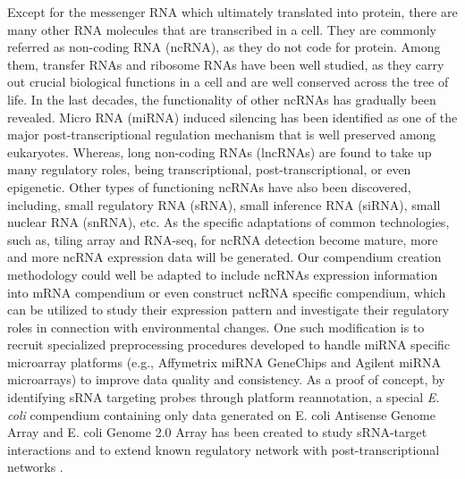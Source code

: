 Except for the messenger RNA which ultimately translated into protein, there are many other RNA molecules that are transcribed in a cell. They are commonly referred as non-coding RNA (ncRNA), as they do not code for protein. Among them, transfer RNAs and ribosome RNAs have been well studied, as they carry out crucial biological functions in a cell and are well conserved across the tree of life. In the last decades, the functionality of other ncRNAs has gradually been revealed. Micro RNA (miRNA) induced silencing has been identified as one of the major post-transcriptional regulation mechanism that is well preserved among eukaryotes\cite{Chen2007a}. Whereas, long non-coding RNAs (lncRNAs) are found to take up many regulatory roles, being transcriptional, post-transcriptional, or even epigenetic\cite{Baker2011}. Other types of functioning ncRNAs have also been discovered, including, small regulatory RNA (sRNA), small inference RNA (siRNA), small nuclear RNA (snRNA), etc. As the specific adaptations of common technologies, such as, tiling array and RNA-seq, for ncRNA detection become mature, more and more ncRNA expression data will be generated. Our compendium creation methodology could well be adapted to include ncRNAs expression information into mRNA compendium or even construct ncRNA specific compendium, which can be utilized to study their expression pattern and investigate their regulatory roles in connection with environmental changes. One such modification is to recruit specialized preprocessing procedures developed to handle miRNA specific microarray platforms (e.g., Affymetrix miRNA GeneChips and Agilent miRNA microarrays) to improve data quality and consistency. As a proof of concept, by identifying sRNA targeting probes through platform  reannotation, a special \textit{E. coli} compendium containing only data generated on E. coli Antisense Genome Array and E. coli Genome 2.0 Array has  been created to study sRNA-target interactions and to extend known regulatory  network with post-transcriptional networks \cite{Ishchukov2014}.






















